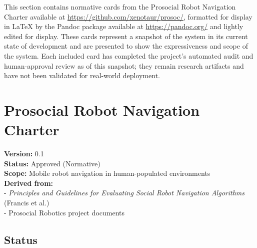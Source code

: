 \documentclass[utf8]{frontiers_suppmat} %
\begin{document}
This section contains normative cards from the Prosocial Robot Navigation Charter available at
\url{https://github.com/xenotaur/prosoc/}, formatted for display in LaTeX by the Pandoc package available at \url{https://pandoc.org/} and lightly edited for display. These cards represent a snapshot of the system in its current state of development and are presented to show the expressiveness and scope of the system. Each included card has completed the project's automated audit and human-approval review as of this snapshot; they remain research artifacts and have not been validated for real-world deployment.

\section{Prosocial Robot Navigation
Charter}\label{prosocial-robot-navigation-charter}

\textbf{Version:} 0.1\\
\textbf{Status:} Approved (Normative)\\
\textbf{Scope:} Mobile robot navigation in human-populated
environments\\
\textbf{Derived from:}\\
- \emph{Principles and Guidelines for Evaluating Social Robot Navigation
Algorithms} (Francis et al.)\\
- Prosocial Robotics project documents

\subsection{Status}\label{status}
\end{document}
